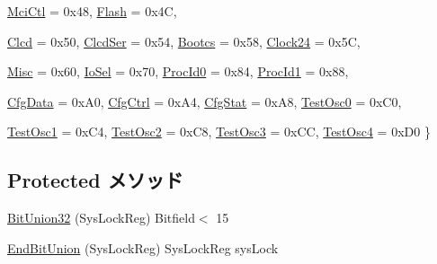\begin{DoxyCompactItemize}
\hyperlink{classRealViewCtrl_a157d5577a5b2f5986037d0d09c7dc77da0043774f9fcf67148a129dde561cd019}{MciCtl} =  0x48, 
\hyperlink{classRealViewCtrl_a157d5577a5b2f5986037d0d09c7dc77dab5fcae55946da2e578e45bef020fa9e2}{Flash} =  0x4C, 
\par
\hyperlink{classRealViewCtrl_a157d5577a5b2f5986037d0d09c7dc77da06b862d9c6b75fe27546a47410749f2d}{Clcd} =  0x50, 
\hyperlink{classRealViewCtrl_a157d5577a5b2f5986037d0d09c7dc77da301f2c10b562e1bdc2a408cd4d8c5ef3}{ClcdSer} =  0x54, 
\hyperlink{classRealViewCtrl_a157d5577a5b2f5986037d0d09c7dc77daf72023b966eb9d87faed297c3b7f584b}{Bootcs} =  0x58, 
\hyperlink{classRealViewCtrl_a157d5577a5b2f5986037d0d09c7dc77da180440c0077159a8c66dfd775d166d6b}{Clock24} =  0x5C, 
\par
\hyperlink{classRealViewCtrl_a157d5577a5b2f5986037d0d09c7dc77dad6915ac2e075642a8903f6b91470f67f}{Misc} =  0x60, 
\hyperlink{classRealViewCtrl_a157d5577a5b2f5986037d0d09c7dc77da5c3846ac231e9a4be6e49f335033b6ca}{IoSel} =  0x70, 
\hyperlink{classRealViewCtrl_a157d5577a5b2f5986037d0d09c7dc77da9d272a09bba1582da640c2bb82785c59}{ProcId0} =  0x84, 
\hyperlink{classRealViewCtrl_a157d5577a5b2f5986037d0d09c7dc77daab2bc412fb690557de5d854f07d9a4fb}{ProcId1} =  0x88, 
\par
\hyperlink{classRealViewCtrl_a157d5577a5b2f5986037d0d09c7dc77da82141ba8fb115574eabfbf14e4126752}{CfgData} =  0xA0, 
\hyperlink{classRealViewCtrl_a157d5577a5b2f5986037d0d09c7dc77da4ac040149b30043cb3e1525319d1b327}{CfgCtrl} =  0xA4, 
\hyperlink{classRealViewCtrl_a157d5577a5b2f5986037d0d09c7dc77da69bd066a1fdede72323111f85a472285}{CfgStat} =  0xA8, 
\hyperlink{classRealViewCtrl_a157d5577a5b2f5986037d0d09c7dc77da8900ffb47964c313612d8af427652946}{TestOsc0} =  0xC0, 
\par
\hyperlink{classRealViewCtrl_a157d5577a5b2f5986037d0d09c7dc77da60e149a584a5564acf519b5b1b82e033}{TestOsc1} =  0xC4, 
\hyperlink{classRealViewCtrl_a157d5577a5b2f5986037d0d09c7dc77da3212c51107727b1e77db6357f667d2c1}{TestOsc2} =  0xC8, 
\hyperlink{classRealViewCtrl_a157d5577a5b2f5986037d0d09c7dc77da4e3a04f87230c2c0f6c470af9d04fbf0}{TestOsc3} =  0xCC, 
\hyperlink{classRealViewCtrl_a157d5577a5b2f5986037d0d09c7dc77da7842ea9f195c8a5db45e78ab1448adc7}{TestOsc4} =  0xD0
 \}
\end{DoxyCompactItemize}
\subsection*{Protected メソッド}
\begin{DoxyCompactItemize}
\item 
\hyperlink{classRealViewCtrl_a623e99eb6c307be3f314e3270a9c3193}{BitUnion32} (SysLockReg) Bitfield$<$ 15
\item 
\hyperlink{classRealViewCtrl_ab3f7e7f4f53a9c536fc272a8baec0cfc}{EndBitUnion} (SysLockReg) SysLockReg sysLock
\end{DoxyCompactItemize}
